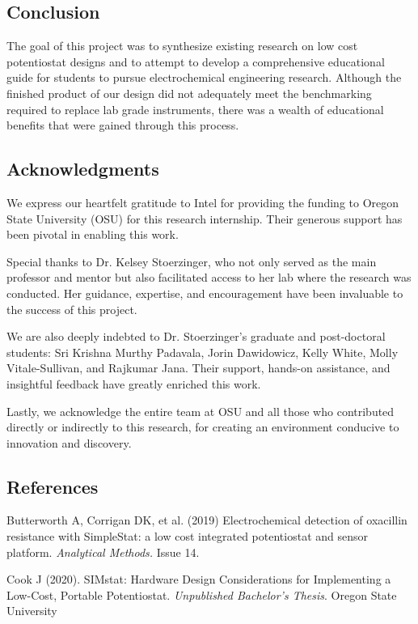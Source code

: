 \documentclass{article}
\begin{document}
\subsection*{Conclusion}
The goal of this project was to synthesize existing research on low cost potentiostat designs and to attempt to develop a comprehensive educational guide for students to pursue electrochemical engineering research. Although the finished product of our design did not adequately meet the benchmarking required to replace lab grade instruments, there was a wealth of educational benefits that were gained through this process. 


\subsection*{Acknowledgments}

We express our heartfelt gratitude to Intel for providing the funding to Oregon State University (OSU) for this research internship. Their generous support has been pivotal in enabling this work.

Special thanks to Dr. Kelsey Stoerzinger, who not only served as the main professor and mentor but also facilitated access to her lab where the research was conducted. Her guidance, expertise, and encouragement have been invaluable to the success of this project.

We are also deeply indebted to Dr. Stoerzinger's graduate and post-doctoral students: Sri Krishna Murthy Padavala, Jorin Dawidowicz, Kelly White, Molly Vitale-Sullivan, and Rajkumar Jana. Their support, hands-on assistance, and insightful feedback have greatly enriched this work.

Lastly, we acknowledge the entire team at OSU and all those who contributed directly or indirectly to this research, for creating an environment conducive to innovation and discovery.

\subsection*{References}
Butterworth A, Corrigan DK, et al. (2019) Electrochemical detection of oxacillin resistance with SimpleStat: a low cost integrated potentiostat and sensor platform. \emph{Analytical Methods.} Issue 14. 

Cook J (2020). SIMstat: Hardware Design Considerations for Implementing a Low-Cost, Portable Potentiostat. \emph{Unpublished Bachelor's Thesis}. Oregon State University
\end{document}
